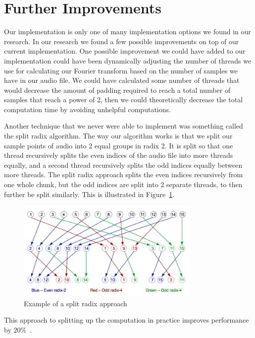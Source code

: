 \documentclass[journal]{IEEEtran}
\begin{document}
\section{Further Improvements}
	\par {
		Our implementation is only one of many implementation options we found in our research. In our research 
		we found a few possible improvements on top of our current implementation. One possible improvement we 
		could have added to our implementation could have been dynamically adjusting the number of threads we 
		use for calculating our Fourier transform based on the number of samples we have in our audio file. 
		We could have calculated some number of threads that would decrease the amount of padding required 
		to reach a total number of samples that reach a power of 2, then we could theoretically 
		decrease the total computation time by avoiding unhelpful computations.
	}

	\par {
		Another technique that we never were able to implement was something called the split radix algorithm. 
		The way our algorithm works is that we split our sample points of audio into 2 equal groups in radix 2. 
		It is split so that one thread recursively splits the even indices of the audio file into more threads 
		equally, and a second thread recursively splits the odd indices equally between more threads. 
		The split radix approach splits the even indices recursively from one whole chunk, but the odd indices are 
		split into 2 separate threads, to then further be split similarly. 
		This is illustrated in Figure~\ref{fig:splitradix}.
	}

	\begin{figure}
		\includegraphics[width=3.5in]{images/splitradix.png}
		\caption{Example of a split radix approach~\cite{FFTLitReview}}
		\label{fig:splitradix}
	\end{figure}

	\par This approach to splitting up the computation in practice improves performance by $20\%$~\cite{splitradix}.
\end{document}
